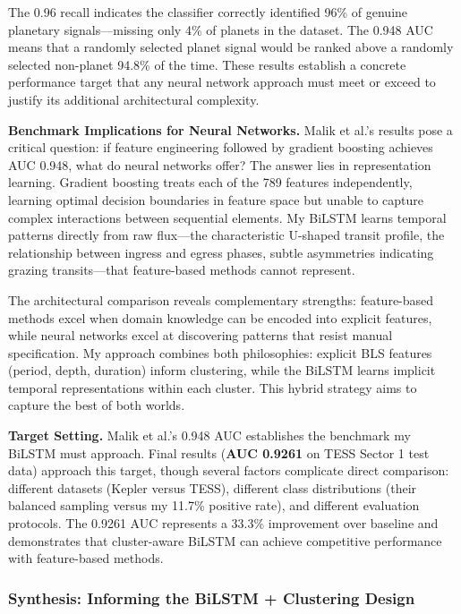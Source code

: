 \documentclass[letterpaper]{article} %
\begin{document}
The 0.96 recall indicates the classifier correctly identified 96\% of genuine planetary signals---missing only 4\% of planets in the dataset. The 0.948 AUC means that a randomly selected planet signal would be ranked above a randomly selected non-planet 94.8\% of the time. These results establish a concrete performance target that any neural network approach must meet or exceed to justify its additional architectural complexity.

\textbf{Benchmark Implications for Neural Networks.} Malik et al.'s results pose a critical question: if feature engineering followed by gradient boosting achieves AUC 0.948, what do neural networks offer? The answer lies in representation learning. Gradient boosting treats each of the 789 features independently, learning optimal decision boundaries in feature space but unable to capture complex interactions between sequential elements. My BiLSTM learns temporal patterns directly from raw flux---the characteristic U-shaped transit profile, the relationship between ingress and egress phases, subtle asymmetries indicating grazing transits---that feature-based methods cannot represent.

The architectural comparison reveals complementary strengths: feature-based methods excel when domain knowledge can be encoded into explicit features, while neural networks excel at discovering patterns that resist manual specification. My approach combines both philosophies: explicit BLS features (period, depth, duration) inform clustering, while the BiLSTM learns implicit temporal representations within each cluster. This hybrid strategy aims to capture the best of both worlds.

\textbf{Target Setting.} Malik et al.'s 0.948 AUC establishes the benchmark my BiLSTM must approach. Final results (\textbf{AUC 0.9261} on TESS Sector 1 test data) approach this target, though several factors complicate direct comparison: different datasets (Kepler versus TESS), different class distributions (their balanced sampling versus my 11.7\% positive rate), and different evaluation protocols. The 0.9261 AUC represents a 33.3\% improvement over baseline and demonstrates that cluster-aware BiLSTM can achieve competitive performance with feature-based methods.

\subsubsection{Synthesis: Informing the BiLSTM + Clustering Design}
\end{document}
